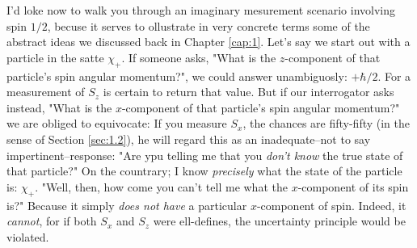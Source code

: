 I'd loke now to walk you through an imaginary mesurement scenario involving spin $1/2$, becuse it serves to ollustrate in very concrete terms some of the abstract ideas we discussed back in Chapter \ref{cap:1}. Let's say we start out with a particle in the satte $\chi_+$. If someone asks, "What is the $z$-component of that particle's spin angular momentum?", we could answer unambiguosly: $+\hbar/2$. For a measurement of $S_z$ is certain to return that value. But if our interrogator asks instead, "What is the $x$-component of that particle's spin angular momentum?" we are obliged to equivocate: If you measure $S_x$, the chances are fifty-fifty (in the sense of Section \ref{sec:1.2}), he will regard this as an inadequate--not to say impertinent--response: "Are ypu telling me that you \textit{don't know} the true state of that particle?" On the countrary; I know \textit{precisely} what the state of the particle is: $\chi_+$. "Well, then, how come you can't tell me what the $x$-component of its spin is?" Because it simply \textit{does not have} a particular $x$-component of spin. Indeed, it \textit{cannot}, for if both $S_x$ and $S_z$ were ell-defines, the uncertainty principle would be violated.

























